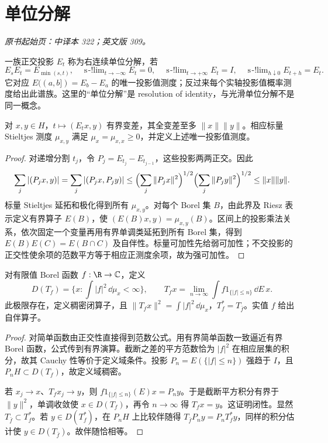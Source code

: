\section{单位分解}\label{sec:yosida-11-05}
\noindent\textit{原书起始页：中译本 322；英文版 309。}

\begin{definition}[实轴单位分解]
一族正交投影 $E_t$ 称为右连续单位分解，若
\[
 E_sE_t=E_{\min(s,t)},\quad
 \mathop{\mathrm{s\!-!lim}}_{t\to-\infty}E_t=0,\quad
 \mathop{\mathrm{s\!-!lim}}_{t\to+\infty}E_t=I,\quad
 \mathop{\mathrm{s\!-!lim}}_{h\downarrow0}E_{t+h}=E_t.
\]
它对应 $E((a,b])=E_b-E_a$ 的唯一投影值测度；反过来每个实轴投影值概率测度给出此谱族。这里的“单位分解”是 resolution of identity，与光滑单位分解不是同一概念。
\end{definition}

\begin{proposition}[从谱族到测度]
对 $x,y\in H$，$t\mapsto(E_tx,y)$ 有界变差，其全变差至多 $\|x\|\|y\|$。相应标量 Stieltjes 测度 $\mu_{x,y}$ 满足 $\mu_x=\mu_{x,x}\ge0$，并定义上述唯一投影值测度。
\end{proposition}
\begin{proof}
对递增分割 $t_j$，令 $P_j=E_{t_j}-E_{t_{j-1}}$，这些投影两两正交。因此
\[
 \sum_j|(P_jx,y)|=\sum_j|(P_jx,P_jy)|
 \le\Bigl(\sum_j\|P_jx\|^2\Bigr)^{1/2}
     \Bigl(\sum_j\|P_jy\|^2\Bigr)^{1/2}\le\|x\|\|y\|.
\]
标量 Stieltjes 延拓和极化得到所有 $\mu_{x,y}$。对每个 Borel 集 $B$，由此界及 Riesz 表示定义有界算子 $E(B)$，使 $(E(B)x,y)=\mu_{x,y}(B)$。区间上的投影乘法关系，依次固定一个变量再用有界单调类延拓到所有 Borel 集，得到 $E(B)E(C)=E(B\cap C)$ 及自伴性。标量可加性先给弱可加性；不交投影的正交性使余项的范数平方等于相应正测度余项，故为强可加性。
\end{proof}

\begin{theorem}[谱积分的定义域]\label{thm:y11-spectral-integral}
对有限值 Borel 函数 $f:\R\to\mathbb C$，定义
\[
 D(T_f)=\{x:\int|f|^2\,\dd\mu_x<\infty\},\qquad
 T_fx=\lim_{n\to\infty}\int f1_{\{|f|\le n\}}\,\dd E\,x.
\]
此极限存在，定义稠密闭算子，且 $\|T_fx\|^2=\int|f|^2\,\dd\mu_x$，$T_f^*=T_{\bar f}$。实值 $f$ 给出自伴算子。
\end{theorem}
\begin{proof}
对简单函数由正交性直接得到范数公式。用有界简单函数一致逼近有界 Borel 函数，公式传到有界演算。截断之差的平方范数恰为 $|f|^2$ 在相应层集的积分，故其 Cauchy 性等价于定义域条件。投影 $P_n=E(\{|f|\le n\})$ 强趋于 $I$，且 $P_nH\subset D(T_f)$，故定义域稠密。

若 $x_j\to x$、$T_fx_j\to y$，则 $f1_{\{|f|\le n\}}(E)x=P_ny$。于是截断平方积分有界于 $\|y\|^2$，单调收敛使 $x\in D(T_f)$，再令 $n\to\infty$ 得 $T_fx=y$。这证明闭性。显然 $T_{\bar f}\subset T_f^*$。若 $y\in D(T_f^*)$，在 $P_nH$ 上比较伴随得 $T_{\bar f}P_ny=P_nT_f^*y$，同样的积分估计使 $y\in D(T_{\bar f})$。故伴随恰相等。
\end{proof}

